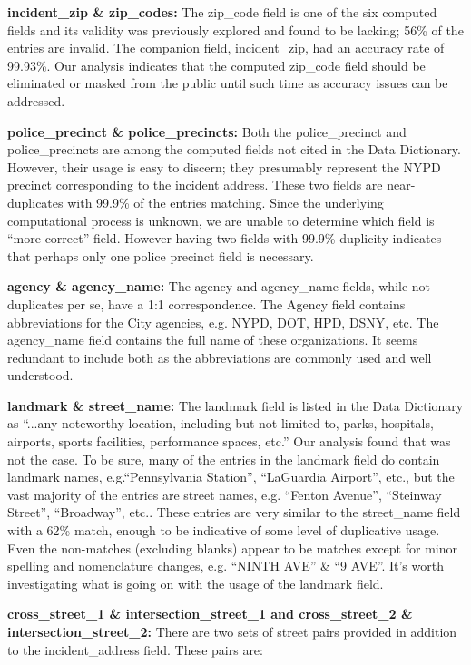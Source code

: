 \documentclass[12pt, titlepage]{article}
\begin{document}
\label{sec:zipcodes}
\textbf{incident\_zip \& zip\_codes:} The zip\_code field is one 
of the six computed fields and its validity 
 was previously explored and found to be 
 lacking; 56\% of the entries are invalid. The companion 
 field, incident\_zip, had an accuracy rate of 99.93\%. Our analysis
 indicates that the computed zip\_code field should be eliminated
 or masked from the public until such time as accuracy 
 issues can be addressed. 


\label{sec:police} 
\textbf{police\_precinct \& police\_precincts:} Both the 
police\_precinct and police\_precincts are among the computed 
fields not cited in the Data Dictionary. However, their usage is easy to 
discern; they presumably represent the NYPD precinct 
corresponding to the incident address. These two 
fields are near-duplicates with 99.9\% of the entries 
matching. Since the underlying computational process 
is unknown, we are unable to determine which 
field is ``more correct'' field. However having two fields with 99.9\% 
duplicity indicates that perhaps only one police 
precinct field is necessary.


\label{sec:agencyname}
\textbf{agency \& agency\_name:} The agency and agency\_name 
fields, while not duplicates per se, have a 1:1 correspondence. The 
Agency field contains abbreviations for the City agencies, e.g. NYPD, 
DOT, HPD, DSNY, etc. The agency\_name field contains the full name 
of these organizations. It seems redundant to include both as 
the abbreviations are commonly used and well understood.


\label{sec:landmark}
\textbf{landmark \& street\_name:} The landmark field is listed 
in the Data Dictionary as ``...any noteworthy location, 
including but not limited to, parks, hospitals, airports, sports 
facilities, performance spaces, etc.'' Our analysis
found that was not the case. To be sure, many of the entries in 
the landmark field do contain landmark names, e.g.``Pennsylvania 
Station'', ``LaGuardia Airport'', etc.,  but the vast majority 
of the entries are street names, e.g. ``Fenton Avenue'', ``Steinway 
Street'', ``Broadway'', etc.. These entries are very similar to the 
street\_name field with a 62\% match, enough to be indicative 
of some level of duplicative usage. Even the non-matches 
(excluding blanks) appear to be matches except for 
minor spelling and nomenclature changes, 
e.g. ``NINTH AVE'' \& ``9 AVE''. It's worth investigating what is going on
with the usage of the landmark field.

	
\label{sec:cross-street}
\textbf{cross\_street\_1 \& intersection\_street\_1 and cross\_street\_2 
\& intersection\_street\_2: } There are two sets of street pairs provided 
in addition to the incident\_address field. These pairs are:
\end{document}
